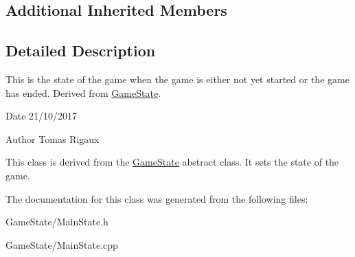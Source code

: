 \subsection*{Additional Inherited Members}


\subsection{Detailed Description}
This is the state of the game when the game is either not yet started or the game has ended. Derived from \hyperlink{classGameState}{Game\-State}. 

\begin{DoxyDate}{Date}
21/10/2017 
\end{DoxyDate}
\begin{DoxyAuthor}{Author}
Tomas Rigaux
\end{DoxyAuthor}
This class is derived from the \hyperlink{classGameState}{Game\-State} abstract class. It sets the state of the game. 

The documentation for this class was generated from the following files\-:\begin{DoxyCompactItemize}
\item 
Game\-State/Main\-State.\-h\item 
Game\-State/Main\-State.\-cpp\end{DoxyCompactItemize}
